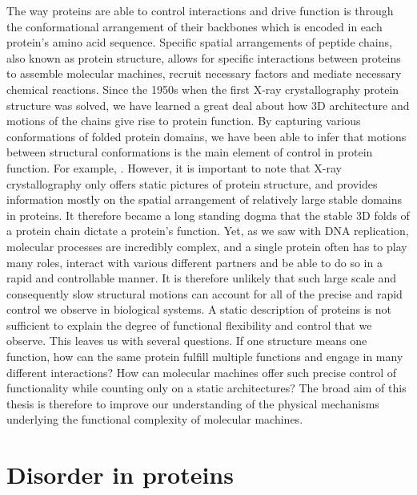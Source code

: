 The way proteins are able to control interactions and drive function is through the conformational arrangement of their backbones which is encoded in each protein's amino acid sequence. Specific spatial arrangements of peptide chains, also known as protein structure, allows for specific interactions between proteins to assemble molecular machines, recruit necessary factors and mediate necessary chemical reactions.  Since the 1950s when the first X-ray crystallography protein structure was solved, we have learned a great deal about how 3D architecture and motions of the chains give rise to protein function. By capturing various conformations of folded protein domains, we have been able to infer that motions between structural conformations is the main element of control in protein function. For example, .   However, it is important to note that X-ray crystallography only offers static pictures of protein structure, and provides information mostly on the spatial arrangement of relatively large stable domains in proteins. It therefore became a long standing dogma that the stable 3D folds of a protein chain dictate a protein's function. Yet, as we saw with DNA replication, molecular processes are incredibly complex, and a single protein often has to play many roles, interact with various different partners and be able to do so in a rapid and controllable manner. It is therefore unlikely that such large scale and consequently slow structural motions can account for all of the precise and rapid control we observe in biological systems. A static description of proteins is not sufficient to explain the degree of functional flexibility and control that we observe. This leaves us with several questions. If one structure means one function, how can the same protein fulfill multiple functions and engage in many different interactions? How can molecular machines offer such precise control of functionality while counting only on a static architectures? The broad aim of this thesis is therefore to improve our understanding of the physical mechanisms underlying the functional complexity of molecular machines.

\section{Disorder in proteins}

